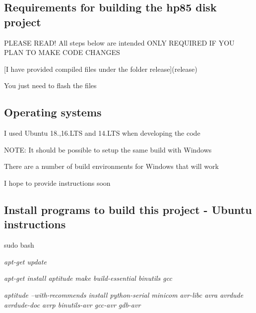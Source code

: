 \subsection*{Requirements for building the hp85 disk project}


\begin{DoxyItemize}
\item P\+L\+E\+A\+SE R\+E\+A\+D! All steps below are intended O\+N\+LY R\+E\+Q\+U\+I\+R\+ED IF Y\+OU P\+L\+AN TO M\+A\+KE C\+O\+DE C\+H\+A\+N\+G\+ES
\item \mbox{[}I have provided compiled files under the folder release\mbox{]}(release)
\begin{DoxyItemize}
\item You just need to flash the files
\end{DoxyItemize}
\end{DoxyItemize}

\subsection*{Operating systems}


\begin{DoxyItemize}
\item I used Ubuntu 18.,16.\+L\+TS and 14.\+L\+TS when developing the code
\begin{DoxyItemize}
\item N\+O\+TE\+: It should be possible to setup the same build with Windows
\begin{DoxyItemize}
\item There are a number of build environments for Windows that will work
\begin{DoxyItemize}
\item I hope to provide instructions soon
\end{DoxyItemize}
\end{DoxyItemize}
\end{DoxyItemize}
\end{DoxyItemize}

\subsection*{Install programs to build this project -\/ Ubuntu instructions}


\begin{DoxyItemize}
\item sudo bash
\item {\itshape apt-\/get update}
\item {\itshape apt-\/get install aptitude make build-\/essential binutils gcc}
\item {\itshape aptitude --with-\/recommends install python-\/serial minicom avr-\/libc avra avrdude avrdude-\/doc avrp binutils-\/avr gcc-\/avr gdb-\/avr}
\end{DoxyItemize}

